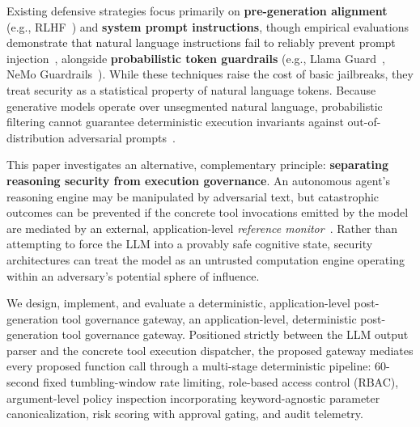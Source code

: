 \documentclass[10pt,twocolumn,letterpaper]{article}
\begin{document}
Existing defensive strategies focus primarily on \textbf{pre-generation alignment} (e.g., RLHF~\cite{ouyang}) and \textbf{system prompt instructions}, though empirical evaluations demonstrate that natural language instructions fail to reliably prevent prompt injection~\cite{perez}, alongside \textbf{probabilistic token guardrails} (e.g., Llama Guard~\cite{llamaguard}, NeMo Guardrails~\cite{nemoguardrails}). While these techniques raise the cost of basic jailbreaks, they treat security as a statistical property of natural language tokens. Because generative models operate over unsegmented natural language, probabilistic filtering cannot guarantee deterministic execution invariants against out-of-distribution adversarial prompts~\cite{zou}.

This paper investigates an alternative, complementary principle: \textbf{separating reasoning security from execution governance}. An autonomous agent's reasoning engine may be manipulated by adversarial text, but catastrophic outcomes can be prevented if the concrete tool invocations emitted by the model are mediated by an external, application-level \emph{reference monitor}~\cite{anderson,schneider}. Rather than attempting to force the LLM into a provably safe cognitive state, security architectures can treat the model as an untrusted computation engine operating within an adversary's potential sphere of influence.

We design, implement, and evaluate a deterministic, application-level post-generation tool governance gateway, an application-level, deterministic post-generation tool governance gateway. Positioned strictly between the LLM output parser and the concrete tool execution dispatcher, the proposed gateway mediates every proposed function call through a multi-stage deterministic pipeline: 60-second fixed tumbling-window rate limiting, role-based access control (RBAC), argument-level policy inspection incorporating keyword-agnostic parameter canonicalization, risk scoring with approval gating, and audit telemetry.
\end{document}
